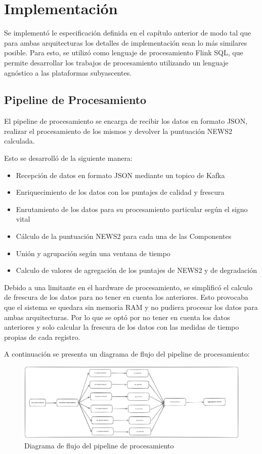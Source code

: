 \section{Implementación}

Se implementó le especificación definida en el capítulo anterior de modo tal que para ambas arquitecturas los detalles de implementación sean lo más similares posible.
Para esto, se utilizó como lenguaje de procesamiento Flink SQL, que permite desarrollar los trabajos de procesamiento utilizando un lenguaje agnóstico a las plataformas subyascentes. 

\subsection{Pipeline de Procesamiento}
El pipeline de procesamiento se encarga de recibir los datos en formato JSON,
realizar el procesamiento de los mismos y devolver la puntuación NEWS2 calculada.

Esto se desarrolló de la siguiente manera:
\begin{itemize}
    \item Recepción de datos en formato JSON mediante un topico de Kafka
    \item Enriquecimiento de los datos con los puntajes de calidad y frescura
    \item Enrutamiento de los datos para su procesamiento particular según el signo vital
    \item Cálculo de la puntuación NEWS2 para cada una de las Componentes
    \item Unión y agrupación según una ventana de tiempo
    \item Calculo de valores de agregación de los puntajes de NEWS2 y de degradación
\end{itemize}

Debido a una limitante en el hardware de procesamiento, se simplificó el calculo de frescura de los datos para no tener en cuenta los anteriores. 
Esto provocaba que el sistema se quedara sin memoria RAM y no pudiera procesar los datos para ambas arquitecturas. 
Por lo que se optó por no tener en cuenta los datos anteriores y solo calcular la frescura de los datos con las medidas de tiempo propias de cada registro.

A continuación se presenta un diagrama de flujo del pipeline de procesamiento:
\begin{figure}[h]
    \centering
    \includegraphics[width=1\textwidth]{desarrollo/pipeline.png}
    \caption{Diagrama de flujo del pipeline de procesamiento}
    \label{fig:flowchart}
\end{figure}

